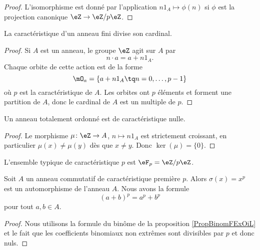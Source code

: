 \begin{proof}
    L'isomorphisme est donné par l'application \( n1_A\mapsto \phi(n)\) si \( \phi\) est la projection canonique \( \eZ\to \eZ/p\eZ\).
\end{proof}

\begin{proposition}     \label{PropGExaUK}
    La caractéristique d'un anneau fini divise son cardinal.
\end{proposition}

\begin{proof}
    Si \( A\) est un anneau, le groupe \( \eZ\) agit sur \( A\) par
    \begin{equation}
        n\cdot a=a+n1_A.
    \end{equation}
    Chaque orbite de cette action est de la forme
    \begin{equation}
        \mO_a=\{ a+n1_A\tq n=0,\ldots, p-1 \}
    \end{equation}
    où \( p\) est la caractéristique de \( A\). Les orbites ont \( p\) éléments et forment une partition de \( A\), donc le cardinal de \( A\) est un multiple de \( p\).
\end{proof}

\begin{lemma}        \label{LEMooJQIKooQgukqn}
    Un anneau totalement ordonné est de caractéristique nulle.
\end{lemma}

\begin{proof}
    Le morphisme \( \mu\colon \eZ\to A\), \( n\mapsto n 1_A\) est strictement croissant, en particulier \( \mu(x)\neq \mu(y)\) dès que \( x\neq y\). Donc \( \ker(\mu)=\{ 0 \}\).
\end{proof}

L'ensemble typique de caractéristique \( p\) est \( \eF_p=\eZ/p\eZ\).



\begin{proposition}     \label{Propqrrdem}
    Soit \( A\) un anneau commutatif de caractéristique première \( p\). Alors \( \sigma(x)=x^p\) est un automorphisme de l'anneau \( A\). Nous avons la formule
    \begin{equation}
        (a+b)^p=a^p+b^p
    \end{equation}
    pour tout \( a,b\in A\).
\end{proposition}

\begin{proof}
    Nous utilisons la formule du binôme de la proposition \ref{PropBinomFExOiL} et le fait que les coefficients binomiaux non extrêmes sont divisibles par \( p\) et donc nuls.
\end{proof}

